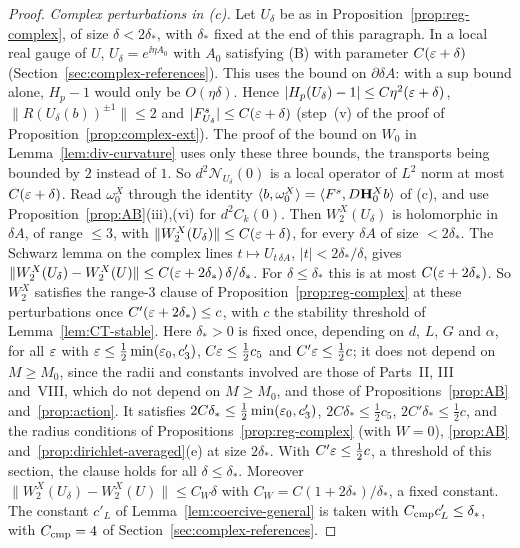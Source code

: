 \begin{proof}
\emph{Complex perturbations in (c).} Let $U_\delta$ be as in Proposition~\ref{prop:reg-complex}, of size $\delta<2\delta_*$, with $\delta_*$ fixed at the end of this paragraph. In a local real gauge of $U$, $U_\delta=e^{\ii\eta A_0}$ with $A_0$ satisfying (B) with parameter $C(\varepsilon+\delta)$ (Section~\ref{sec:complex-references}). This uses the bound on $\partial\delta\!A$: with a sup bound alone, $H_p-1$ would only be $O(\eta\delta)$. Hence $|H_p(U_\delta)-1|\le C\eta^2(\varepsilon+\delta)$, $\|R(U_\delta(b))^{\pm1}\|\le2$ and $|F^s_{U_\delta}|\le C(\varepsilon+\delta)$ (step~(v) of the proof of Proposition~\ref{prop:complex-ext}). The proof of the bound on $W_0$ in Lemma~\ref{lem:div-curvature} uses only these three bounds, the transports being bounded by $2$ instead of $1$. So $d^2\mathcal N_{U_\delta}(0)$ is a local operator of $L^2$ norm at most $C(\varepsilon+\delta)$. Read $\omega_0^X$ through the identity $\langle b,\omega_0^X\rangle=\langle F^s,D\mathbf H^X_0b\rangle$ of (c), and use Proposition~\ref{prop:AB}(iii),(vi) for $d^2C_k(0)$. Then $W_2^X(U_\delta)$ is holomorphic in $\delta\!A$, of range $\le3$, with $\|W_2^X(U_\delta)\|\le C(\varepsilon+\delta)$, for every $\delta\!A$ of size $<2\delta_*$. The Schwarz lemma on the complex lines $t\mapsto U_{t\,\delta\!A}$, $|t|<2\delta_*/\delta$, gives $\|W_2^X(U_\delta)-W_2^X(U)\|\le C(\varepsilon+2\delta_*)\,\delta/\delta_*$. For $\delta\le\delta_*$ this is at most $C(\varepsilon+2\delta_*)$. So $W_2^X$ satisfies the range-$3$ clause of Proposition~\ref{prop:reg-complex} at these perturbations once $C'(\varepsilon+2\delta_*)\le c$, with $c$ the stability threshold of Lemma~\ref{lem:CT-stable}. Here $\delta_*>0$ is fixed once, depending on $d$, $L$, $G$ and $\alpha$, for all $\varepsilon$ with $\varepsilon\le\frac12\min(\varepsilon_0,c'_3)$, $C\varepsilon\le\frac12c_5$ and $C'\varepsilon\le\frac12c$; it does not depend on $M\ge M_0$, since the radii and constants involved are those of Parts~II, III and~VIII, which do not depend on $M\ge M_0$, and those of Propositions~\ref{prop:AB} and~\ref{prop:action}. It satisfies $2C\delta_*\le\frac12\min(\varepsilon_0,c'_3)$, $2C\delta_*\le\frac12c_5$, $2C'\delta_*\le\frac12c$, and the radius conditions of Propositions~\ref{prop:reg-complex} (with $W=0$), \ref{prop:AB} and~\ref{prop:dirichlet-averaged}(e) at size $2\delta_*$. With $C'\varepsilon\le\frac12c$, a threshold of this section, the clause holds for all $\delta\le\delta_*$. Moreover $\|W_2^X(U_\delta)-W_2^X(U)\|\le C_W\delta$ with $C_W=C(1+2\delta_*)/\delta_*$, a fixed constant. The constant $c'_L$ of Lemma~\ref{lem:coercive-general} is taken with $C_{\rm cmp}c'_L\le\delta_*$, with $C_{\rm cmp}=4$ of Section~\ref{sec:complex-references}.
\end{proof}

